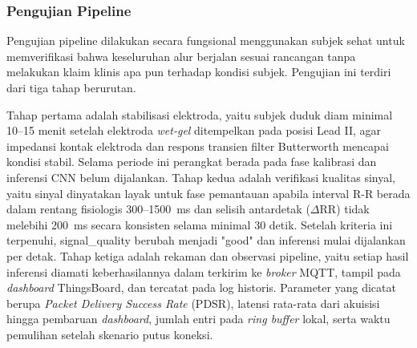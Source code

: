 \subsubsection{Pengujian Pipeline}

Pengujian pipeline dilakukan secara fungsional menggunakan subjek sehat untuk memverifikasi bahwa keseluruhan alur berjalan sesuai rancangan tanpa melakukan klaim klinis apa pun terhadap kondisi subjek. Pengujian ini terdiri dari tiga tahap berurutan.

Tahap pertama adalah stabilisasi elektroda, yaitu subjek duduk diam minimal 10--15 menit setelah elektroda \textit{wet-gel} ditempelkan pada posisi Lead II, agar impedansi kontak elektroda dan respons transien filter Butterworth mencapai kondisi stabil. Selama periode ini perangkat berada pada fase kalibrasi dan inferensi CNN belum dijalankan. Tahap kedua adalah verifikasi kualitas sinyal, yaitu sinyal dinyatakan layak untuk fase pemantauan apabila interval R-R berada dalam rentang fisiologis 300--1500~ms dan selisih antardetak (\(\Delta\)RR) tidak melebihi 200~ms secara konsisten selama minimal 30 detik. Setelah kriteria ini terpenuhi, signal\_quality berubah menjadi "good" dan inferensi mulai dijalankan per detak. Tahap ketiga adalah rekaman dan observasi pipeline, yaitu setiap hasil inferensi diamati keberhasilannya dalam terkirim ke \textit{broker} MQTT, tampil pada \textit{dashboard} ThingsBoard, dan tercatat pada log historis. Parameter yang dicatat berupa \textit{Packet Delivery Success Rate} (PDSR), latensi rata-rata dari akuisisi hingga pembaruan \textit{dashboard}, jumlah entri pada \textit{ring buffer} lokal, serta waktu pemulihan setelah skenario putus koneksi.


